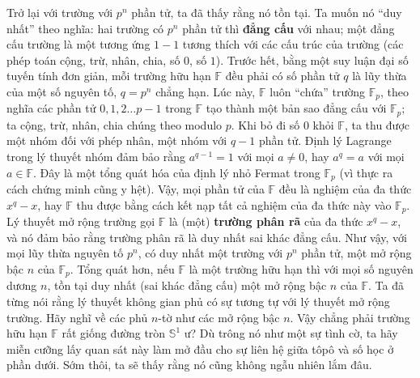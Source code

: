 \begin{multicols}{2}
	\vskip 0.1cm
	Trở lại với trường với $p^n$ phần tử, ta đã thấy rằng nó tồn tại. Ta muốn nó ``duy nhất'' theo nghĩa: hai trường có $p^n$ phần tử thì {\bf\color{duongvaotoanhoc} đẳng cấu} với nhau; một đẳng cấu trường là một tương ứng $1-1$ tương thích với các cấu trúc của trường (các phép toán cộng, trừ, nhân, chia, số $0$, số $1$). Trước hết, bằng một suy luận đại số tuyến tính đơn giản, mỗi trường hữu hạn $\mathbb{F}$ đều phải có số phần tử $q$ là lũy thừa của một số nguyên tố, $q = p^n$ chẳng hạn. Lúc này, $\mathbb{F}$ luôn ``chứa'' trường $\mathbb{F}_p$, theo nghĩa các phần tử $0,1,2 \ldots p-1$ trong $\mathbb{F}$ tạo thành một bản sao đẳng cấu với $\mathbb{F}_p$; ta cộng, trừ, nhân, chia chúng theo modulo $p$. Khi bỏ đi số $0$ khỏi $\mathbb{F}$, ta thu được một nhóm đối với phép nhân, một nhóm với $q-1$ phần tử. Định lý Lagrange trong lý thuyết nhóm đảm bảo rằng $a^{q-1} = 1$ với mọi $a \neq 0$, hay $a^q = a$ với mọi $a \in \mathbb{F}$. Đây là một tổng quát hóa của định lý nhỏ Fermat trong $\mathbb{F}_p$ (vì thực ra cách chứng minh cũng y hệt). Vậy, mọi phần tử của $\mathbb{F}$ đều là nghiệm của đa thức $x^q - x$, hay $\mathbb{F}$ thu được bằng cách kết nạp tất cả nghiệm của đa thức này vào $\mathbb{F}_p$. Lý thuyết mở rộng trường gọi $\mathbb{F}$ là (một) {\bf\color{duongvaotoanhoc} trường phân rã} của đa thức $x^q - x$, và nó đảm bảo rằng trường phân rã là duy nhất sai khác đẳng cấu. Như vậy, với mọi lũy thừa nguyên tố $p^n$, có duy nhất một trường với $p^n$ phần tử, một mở rộng bậc $n$ của $\mathbb{F}_p$.
	\vskip 0.1cm
	Tổng quát hơn, nếu $\mathbb{F}$ là một trường hữu hạn thì với mọi số nguyên dương $n$, tồn tại duy nhất (sai khác đẳng cấu) một mở rộng bậc $n$ của $\mathbb{F}$. Ta đã từng nói rằng lý thuyết không gian phủ có sự tương tự với lý thuyết mở rộng trường. Hãy nghĩ về các phủ $n$-tờ như các mở rộng bậc $n$. Vậy chẳng phải trường hữu hạn $\mathbb{F}$ rất giống đường tròn $\mathbb{S}^1$ ư? Dù trông nó như một sự tình cờ, ta hãy miễn cưỡng lấy quan sát này làm mở đầu cho sự liên hệ giữa tôpô và số học ở phần dưới. Sớm thôi, ta sẽ thấy rằng nó cũng không ngẫu nhiên lắm đâu.

\end{multicols}
